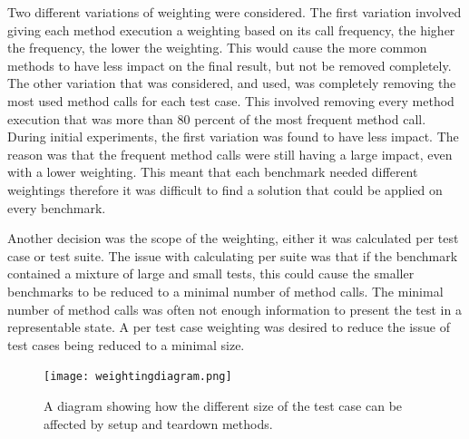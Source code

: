 Two different variations of weighting were considered. The first variation involved giving each method execution a weighting based on its call frequency, the higher the frequency, the lower the weighting. This would cause the more common methods to have less impact on the final result, but not be removed completely. The other variation that was considered, and used, was completely removing the most used method calls for each test case. This involved removing every method execution that was more than 80 percent of the most frequent method call. During initial experiments, the first variation was found to have less impact. The reason was that the frequent method calls were still having a large impact, even with a lower weighting. This meant that each benchmark needed different weightings therefore it was difficult to find a solution that could be applied on every benchmark.

Another decision was the scope of the weighting, either it was calculated per test case or test suite. The issue with calculating per suite was that if the benchmark contained a mixture of large and small tests, this could cause the smaller benchmarks to be reduced to a minimal number of method calls. The minimal number of method calls was often not enough information to present the test in a representable state. A per test case weighting was desired to reduce the issue of test cases being reduced to a minimal size.

\begin{figure}[h]
\texttt{[image: weightingdiagram.png]}
\caption{A diagram showing how the different size of the test case can be affected by setup and teardown methods.}
\label{fig:weightingdiagram}
\end{figure}
